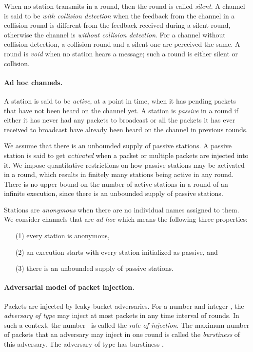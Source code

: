 \documentclass[11pt]{article}
\newcommand{\BBB}{\vspace*{-\bigskipamount}}
\newcommand{\Paragraph}[1]{\BBB\paragraph{#1}}
\begin{document}
When no station transmits in a round, then the round is called \emph{silent}.
A channel is said to be \emph{with collision detection} when the feedback from the channel in a collision round is different from the feedback received during a silent round,  otherwise the channel is \emph{without collision detection}. 
For a channel without collision detection, a collision round and a silent one are perceived  the same. 
A round is \emph{void} when no station hears a message; such a round is either silent or collision.


\Paragraph{Ad hoc channels.}


A station is said to be \emph{active}, at a point in time, when it has pending packets that have not been heard on the channel yet.
A station is  \emph{passive} in a round if either it has never had any packets to broadcast or all the packets it has ever received to broadcast have already been heard on the channel in previous rounds.

We assume that there is an unbounded supply of passive stations.
A passive station is said to get \emph{activated} when a packet or multiple packets are injected into it. 
We impose quantitative restrictions on how passive stations may be activated in a round, which results in finitely many stations being active in any round.
There is no upper bound on the number of active stations in a round of an infinite execution, since there is an unbounded supply of passive stations.


Stations are \emph{anonymous} when there are no individual names assigned to them.
We consider channels that are \emph{ad hoc} which means the following three properties: 
\begin{enumerate}
\item[(1)]
every station is anonymous, 
\item[(2)] 
an execution starts with every station initialized as passive, and 
\item[(3)] 
there is an unbounded supply of passive stations.
\end{enumerate}




\Paragraph{Adversarial model of packet injection.}





Packets are injected by leaky-bucket adversaries.
For a number  and integer , the \emph{adversary of  type } may inject at most  packets in any time interval  of  rounds.
In such a context, the number~ is called the \emph{rate of injection}.
The maximum number of packets that an adversary may inject in one round is called the \emph{burstiness} of this adversary.
The adversary of type  has burstiness .
\end{document}
